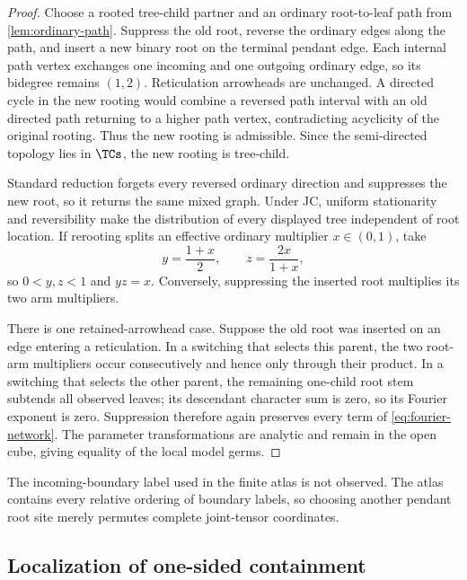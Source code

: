 \begin{proof}
Choose a rooted tree-child partner and an ordinary root-to-leaf path from \cref{lem:ordinary-path}.  Suppress the old root, reverse the ordinary edges along the path, and insert a new binary root on the terminal pendant edge.  Each internal path vertex exchanges one incoming and one outgoing ordinary edge, so its bidegree remains $(1,2)$.  Reticulation arrowheads are unchanged.  A directed cycle in the new rooting would combine a reversed path interval with an old directed path returning to a higher path vertex, contradicting acyclicity of the original rooting.  Thus the new rooting is admissible.  Since the semi-directed topology lies in $\TCs$, the new rooting is tree-child.

Standard reduction forgets every reversed ordinary direction and suppresses the new root, so it returns the same mixed graph.  Under JC, uniform stationarity and reversibility make the distribution of every displayed tree independent of root location.  If rerooting splits an effective ordinary multiplier $x\in(0,1)$, take
\begin{equation}\label{eq:root-split}
y=\frac{1+x}{2},
\qquad
z=\frac{2x}{1+x},
\end{equation}
so $0<y,z<1$ and $yz=x$.  Conversely, suppressing the inserted root multiplies its two arm multipliers.

There is one retained-arrowhead case.  Suppose the old root was inserted on an edge entering a reticulation.  In a switching that selects this parent, the two root-arm multipliers occur consecutively and hence only through their product.  In a switching that selects the other parent, the remaining one-child root stem subtends all observed leaves; its descendant character sum is zero, so its Fourier exponent is zero.  Suppression therefore again preserves every term of \eqref{eq:fourier-network}.  The parameter transformations are analytic and remain in the open cube, giving equality of the local model germs.
\end{proof}

The incoming-boundary label used in the finite atlas is not observed.  The atlas contains every relative ordering of boundary labels, so choosing another pendant root site merely permutes complete joint-tensor coordinates.

\subsection{Localization of one-sided containment}

